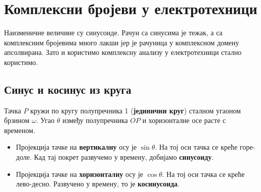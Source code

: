 \documentclass{article}
\begin{document}

\section{Комплексни бројеви у електротехници}

Наизменичне величине су синусоиде. Рачун са синусима је тежак, а са комплексним бројевима много лакши јер је рачуница у комплексном домену апсолвирана. Зато и користимо комплексну анализу у електротехници стално користимо.

\subsection{Синус и косинус из круга}

Тачка $P$ кружи по кругу полупречника 1 (\textbf{јединични круг}) сталном угаоном брзином $\omega$. Угао $\theta$ између полупречника $OP$ и хоризонталне осе расте с временом.
\begin{itemize}
    \item Пројекција тачке на \textbf{вертикалну} осу је $\sin\theta$. На тој оси тачка се креће горе-доле. Кад тај покрет развучемо у времену, добијамо \textbf{синусоиду}.
    \item Пројекција тачке на \textbf{хоризонталну} осу је $\cos\theta$. На тој оси тачка се креће лево-десно. Развучено у времену, то је \textbf{косинусоида}.
\end{itemize}
\end{document}
